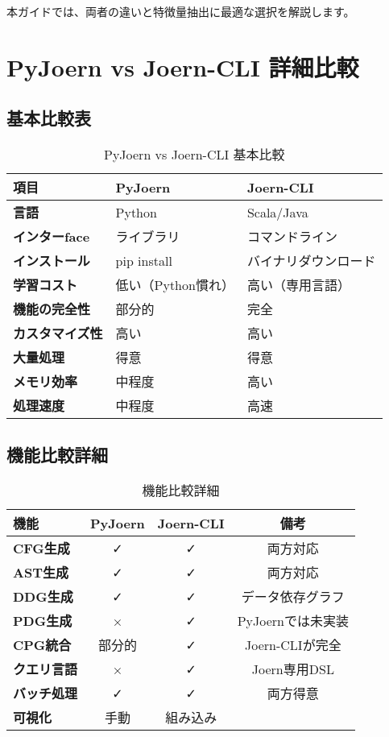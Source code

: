\documentclass[12pt,a4paper]{article}
\begin{document}
本ガイドでは、両者の違いと特徴量抽出に最適な選択を解説します。

\section{PyJoern vs Joern-CLI 詳細比較}

\subsection{基本比較表}

\begin{table}[h!]
\centering
\begin{tabular}{|l|l|l|}
\hline
\textbf{項目} & \textbf{PyJoern} & \textbf{Joern-CLI} \\
\hline
\textbf{言語} & Python & Scala/Java \\
\hline
\textbf{インターface} & ライブラリ & コマンドライン \\
\hline
\textbf{インストール} & pip install & バイナリダウンロード \\
\hline
\textbf{学習コスト} & 低い（Python慣れ） & 高い（専用言語） \\
\hline
\textbf{機能の完全性} & 部分的 & 完全 \\
\hline
\textbf{カスタマイズ性} & 高い & 高い \\
\hline
\textbf{大量処理} & 得意 & 得意 \\
\hline
\textbf{メモリ効率} & 中程度 & 高い \\
\hline
\textbf{処理速度} & 中程度 & 高速 \\
\hline
\end{tabular}
\caption{PyJoern vs Joern-CLI 基本比較}
\end{table}

\subsection{機能比較詳細}

\begin{table}[h!]
\centering
\begin{tabular}{|l|c|c|c|}
\hline
\textbf{機能} & \textbf{PyJoern} & \textbf{Joern-CLI} & \textbf{備考} \\
\hline
\textbf{CFG生成} & ✓ & ✓ & 両方対応 \\
\hline
\textbf{AST生成} & ✓ & ✓ & 両方対応 \\
\hline
\textbf{DDG生成} & ✓ & ✓ & データ依存グラフ \\
\hline
\textbf{PDG生成} & × & ✓ & PyJoernでは未実装 \\
\hline
\textbf{CPG統合} & 部分的 & ✓ & Joern-CLIが完全 \\
\hline
\textbf{クエリ言語} & × & ✓ & Joern専用DSL \\
\hline
\textbf{バッチ処理} & ✓ & ✓ & 両方得意 \\
\hline
\textbf{可視化} & 手動 & 組み込み & \\
\hline
\end{tabular}
\caption{機能比較詳細}
\end{table}
\end{document}
